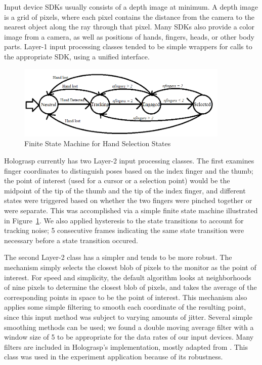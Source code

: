\documentclass[pageno]{jpaper}
\begin{document}
Input device SDKs usually consists of a depth image at minimum. A depth image is a grid of pixels, where each
pixel contains the distance from the camera to the nearest object along the ray through that pixel. Many SDKs
also provide a color image from a camera, as well as positions of hands, fingers, heads, or other body parts.
Layer-1 input processing classes tended to be simple wrappers for calls to the appropriate SDK, using a unified
interface.

\begin{figure}
\centering
\includegraphics[width=0.9\textwidth]{figures/fsm.png}
\caption{Finite State Machine for Hand Selection States}
\label{fig:fsm}
\end{figure}
Holograsp currently has two Layer-2 input processing classes. The first examines finger coordinates to distinguish poses based
on the index finger and the thumb; the point of interest (used for a cursor or a selection point) would be the midpoint of the tip
of the thumb and the tip of the index finger, and different states were triggered based on whether the two fingers were pinched
together or were separate. This was accomplished via a simple finite state machine illustrated in Figure~\ref{fig:fsm}. We also
applied hysteresis to the state transitions to account for tracking noise; 5 consecutive frames indicating the same state transition
were necessary before a state transition occured.

The second Layer-2 class has a simpler and tends to be more robust. The mechanism simply selects the closest blob of pixels to the monitor
as the point of interest. For speed and simplicity, the default algorithm looks at neighborhoods of nine pixels to determine the closest blob of pixels,
and takes the average of the corresponding points in space to be the point of interest. This mechanism also applies some simple filtering to
smooth each coordinate of the resulting point, since this input method was subject to varying amounts of jitter. Several simple
smoothing methods can be used; we found a double moving average filter with a window size of 5 to be appropriate for the data rates of
our input devices. Many filters are included in Holograsp's implementation, mostly adapted from \cite{brown2004smoothing}. This class was
used in the experiment application because of its robustness.
\end{document}
